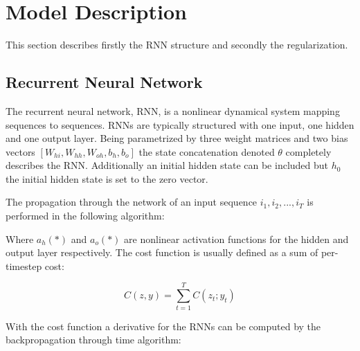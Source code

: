 \chapter{Model Description}

This section describes firstly the RNN structure and secondly the regularization.

\section{Recurrent Neural Network}

The recurrent neural network, RNN, is a nonlinear dynamical system mapping sequences to sequences. RNNs are typically structured with one input, one hidden and one output layer. Being parametrized by three weight matrices and two bias vectors \([W_{hi}, W_{hh}, W_{oh}, b_h, b_o]\) the state concatenation denoted \(\theta\) completely describes the RNN. Additionally an initial hidden state can be included but $h_0$ the initial hidden state is set to the zero vector.

The propagation through the network of an input sequence \(i_1, i_2, ... , i_T\) is performed in the following algorithm:

\begin{algorithmic}[1]
    \EndFor
\end{algorithmic}

Where $ a_h(*)$ and $a_o(*)$ are nonlinear activation functions for the hidden and output layer respectively. The cost function is usually defined as a sum of per-timestep cost:

\[C(z, y) = \sum_{t=1}^{T}C(z_t; y_t)\]

With the cost function a derivative for the RNNs can be computed by the backpropagation through time algorithm:

\begin{algorithmic}[1]
    \EndFor
    \State {}
\end{algorithmic}


